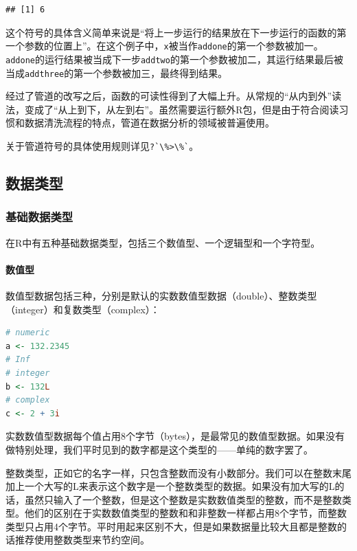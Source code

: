 \documentclass[]{ctexbook}
\let\oldparagraph\paragraph
\renewcommand{\paragraph}[1]{\oldparagraph{#1}\mbox{}}
\newcommand{\passthrough}[1]{#1}
\begin{document}
\begin{lstlisting}
## [1] 6
\end{lstlisting}

这个符号的具体含义简单来说是``将上一步运行的结果放在下一步运行的函数的第一个参数的位置上''。在这个例子中，\passthrough{\lstinline!x!}被当作\passthrough{\lstinline!addone!}的第一个参数被加一。\passthrough{\lstinline!addone!}的运行结果被当成下一步\passthrough{\lstinline!addtwo!}的第一个参数被加二，其运行结果最后被当成\passthrough{\lstinline!addthree!}的第一个参数被加三，最终得到结果。

经过了管道的改写之后，函数的可读性得到了大幅上升。从常规的``从内到外''读法，变成了``从上到下，从左到右''。虽然需要运行额外R包，但是由于符合阅读习惯和数据清洗流程的特点，管道在数据分析的领域被普遍使用。

关于管道符号的具体使用规则详见\passthrough{\lstinline!?`\%>\%`!}。

\hypertarget{ux6570ux636eux7c7bux578b}{%
\subsection{数据类型}\label{ux6570ux636eux7c7bux578b}}

\hypertarget{ux57faux7840ux6570ux636eux7c7bux578b}{%
\subsubsection{基础数据类型}\label{ux57faux7840ux6570ux636eux7c7bux578b}}

在R中有五种基础数据类型，包括三个数值型、一个逻辑型和一个字符型。

\hypertarget{ux6570ux503cux578b}{%
\paragraph{数值型}\label{ux6570ux503cux578b}}

数值型数据包括三种，分别是默认的实数数值型数据（double）、整数类型（integer）和复数类型（complex）：

\begin{lstlisting}[language=R]
# numeric
a <- 132.2345
# Inf
# integer
b <- 132L
# complex
c <- 2 + 3i
\end{lstlisting}

实数数值型数据每个值占用8个字节（bytes），是最常见的数值型数据。如果没有做特别处理，我们平时见到的数字都是这个类型的------单纯的数字罢了。

整数类型，正如它的名字一样，只包含整数而没有小数部分。我们可以在整数末尾加上一个大写的L来表示这个数字是一个整数类型的数据。如果没有加大写的L的话，虽然只输入了一个整数，但是这个整数是实数数值类型的整数，而不是整数类型。他们的区别在于实数数值类型的整数和和非整数一样都占用8个字节，而整数类型只占用4个字节。平时用起来区别不大，但是如果数据量比较大且都是整数的话推荐使用整数类型来节约空间。
\end{document}
